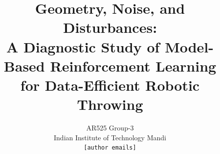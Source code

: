 \documentclass[10pt,twocolumn]{article}
\title{\textbf{Geometry, Noise, and Disturbances:\\
A Diagnostic Study of Model-Based Reinforcement Learning\\
for Data-Efficient Robotic Throwing}}
\author{
  AR525 Group-3 \\
  Indian Institute of Technology Mandi \\
  \texttt{[author emails]}
}
\date{}
\begin{document}
\maketitle



















\clearpage
\onecolumn
\appendix

\end{document}

